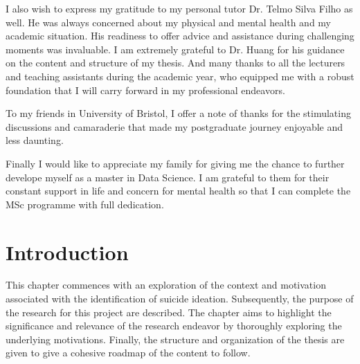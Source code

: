 \documentclass[ %
                    author={Bocheng Wang},
                supervisor={Dr. Qiang Liu},
                    degree={MSc},
                     title={A Research on Identification of Suicide Ideation in Texts with Multiple Models},
                      type={},
                      year={2024}]{dissertation}
\begin{document}
I also wish to express my gratitude to my personal tutor Dr. Telmo Silva Filho as well. He was always concerned about my physical and mental health and my academic situation. His readiness to offer advice and assistance during challenging moments was invaluable. I am extremely grateful to Dr. Huang for his guidance on the content and structure of my thesis. And many thanks to all the lecturers and teaching assistants during the academic year, who equipped me with a robust foundation that I will carry forward in my professional endeavors.

To my friends in University of Bristol, I offer a note of thanks for the stimulating discussions and camaraderie that made my postgraduate journey enjoyable and less daunting.

Finally I would like to appreciate my family for giving me the chance to further develope myself as a master in Data Science. I am grateful to them for their constant support in life and concern for mental health so that I can complete the MSc programme with full dedication.


%

\mainmatter


\chapter{Introduction}
\label{chap:introduction}
\noindent
This chapter commences with an exploration of the context and motivation associated with the identification of suicide ideation. Subsequently, the purpose of the research for this project are described. The chapter aims to highlight the significance and relevance of the research endeavor by thoroughly exploring the underlying motivations. Finally, the structure and organization of the thesis are given to give a cohesive roadmap of the content to follow.
\end{document}
